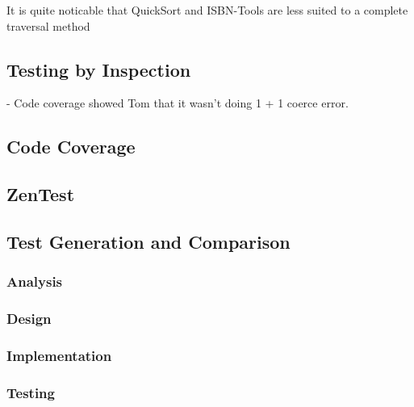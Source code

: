   It is quite noticable that QuickSort and ISBN-Tools are less suited to a complete traversal method 

  \subsection{Testing by Inspection}
  - Code coverage showed Tom that it wasn't doing 1 + 1 coerce error.
  \subsection{Code Coverage}
  \subsection{ZenTest}
  \subsection{Test Generation and Comparison}
    \subsubsection{Analysis}
    \subsubsection{Design}
    \subsubsection{Implementation}
    \subsubsection{Testing}
